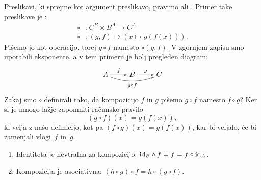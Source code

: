 Preslikavi, ki sprejme kot argument preslikavo, pravimo  ali . Primer take preslikave je :
%
\begin{align*}
  {\circ} &: C^B \times B^A \to C^A \\
  {\circ} &: (g, f) \mapsto (x \mapsto g(f(x))).
\end{align*}
%
Pišemo jo kot operacijo, torej $g \circ f$ namesto ${\circ}(g, f)$. V zgornjem zapisu smo
uporabili eksponente, a v tem primeru je bolj pregleden diagram:
%
\begin{equation*}
  \xymatrix{
    {A}
    \ar[r]^{f}
    \ar@/_2ex/[rr]_{g \circ f}
    &
    {B}
    \ar[r]^{g}
    &
    {C}
  }
\end{equation*}
%
Zakaj smo $\circ$ definirali tako, da kompozicijo $f$ in $g$ pišemo $g \circ f$ namesto
$f \circ g$? Ker si je mnogo lažje zapomniti računsko pravilo
%
\begin{equation*}
  (g \circ f)(x) = g(f(x)),
\end{equation*}
%
ki velja z našo definicijo, kot pa $(f \circ g)(x) = g(f(x))$, kar bi veljalo, če bi
zamenjali vlogi~$f$ in~$g$.

\begin{trditev}
  \parbox{0pt}{}
  \begin{enumerate}
  \item Identiteta je nevtralna za kompozicijo: $\id[B] \circ f = f = f \circ \id[A]$.
  \item Kompozicija je asociativna: $(h \circ g) \circ f = h \circ (g \circ f)$.
  \end{enumerate}
\end{trditev}

